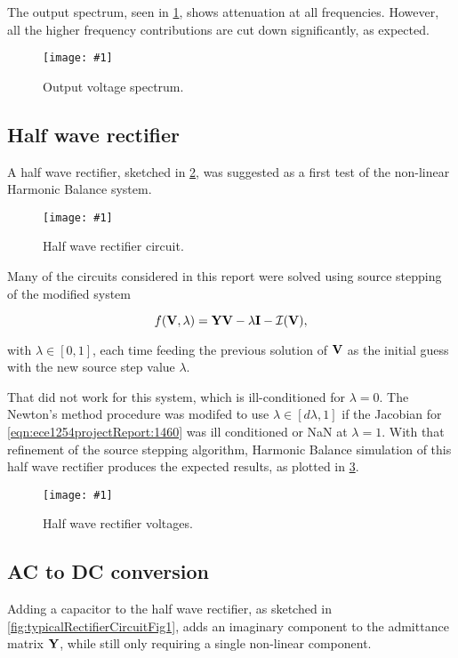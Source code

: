 \documentclass[12pt,journal,compsoc]{../ieeepaper/IEEEtran}
\newcommand{\imageFigureHere}[4]{%
\begin{figure}[!h]%
\centering%
\texttt{[image: \#1]}%
\caption{#2}%
\label{#3}%
\end{figure}%
}
\begin{document}
The output spectrum, seen in \cref{fig:lowPassFilterFig4},
shows attenuation at all frequencies.  However, all the higher frequency contributions are cut down significantly, as expected.

\imageFigureHere{../../figures/ece1254/report/lowPassFilterOutputVoltageSpectrumFig4}{Output voltage spectrum.}{fig:lowPassFilterFig4}{3.0in}

\subsection{Half wave rectifier}

A half wave rectifier, sketched in \cref{fig:HalfWaveRectifierFig1}, was suggested as a first test of the non-linear Harmonic Balance system.

\imageFigureHere{../../figures/ece1254/HalfWaveRectifierFig1}{Half wave rectifier circuit.}{fig:HalfWaveRectifierFig1}{3in}

Many of the circuits considered in this report were solved using source stepping of the modified system

\begin{equation}\label{eqn:ece1254projectReport:1460}
f(\BV, \lambda) = \BY \BV - \lambda \BI - \mathcal{I}(\BV),
\end{equation}

with \( \lambda \in [0, 1] \), each time feeding the previous solution of \( \mathbf{V} \) as the initial guess with the new source step value \( \lambda \).

That did not work for this system, which is ill-conditioned for \( \lambda = 0 \).  The Newton's method procedure was modifed to use \( \lambda \in [d\lambda, 1] \) if the Jacobian for \cref{eqn:ece1254projectReport:1460} was ill conditioned or NaN at \( \lambda = 1 \).  With that refinement of the source stepping algorithm, Harmonic Balance simulation of this half wave rectifier produces the expected results, as plotted in \cref{fig:HalfWaveRectifierFig2}.

\imageFigureHere{../../figures/ece1254/report/halfWaveRectifierVoltageFig2}{Half wave rectifier voltages.}{fig:HalfWaveRectifierFig2}{3in}


\subsection{AC to DC conversion}

Adding a capacitor to the half wave rectifier, as sketched in \cref{fig:typicalRectifierCircuitFig1}, adds an imaginary component to the admittance matrix \( \mathbf{Y} \), while still only requiring a single non-linear component.
\end{document}

